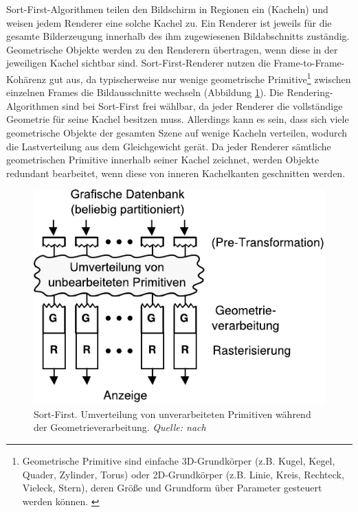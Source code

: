 Sort-First-Algorithmen teilen den Bildschirm in Regionen ein (Kacheln) und weisen jedem Renderer eine solche Kachel zu. Ein Renderer ist jeweils für die gesamte Bilderzeugung innerhalb des ihm zugewiesenen Bildabschnitts zuständig. Geometrische Objekte werden zu den Renderern übertragen, wenn diese in der jeweiligen Kachel sichtbar sind. Sort-First-Renderer nutzen die Frame-to-Frame-Kohärenz gut aus, da typischerweise nur wenige geometrische Primitive\footnote{Geometrische Primitive sind einfache 3D-Grundkörper (z.B. Kugel, Kegel, Quader, Zylinder, Torus) oder 2D-Grundkörper (z.B. Linie, Kreis, Rechteck, Vieleck, Stern), deren Größe und Grundform über Parameter gesteuert werden können. \cite{medieninfo}} zwischen einzelnen Frames die Bildausschnitte wechseln (Abbildung \ref{fig:relwork:sortfirst}). Die Rendering-Algorithmen sind bei Sort-First frei wählbar, da jeder Renderer die vollständige Geometrie für seine Kachel besitzen muss. Allerdings kann es sein, dass sich viele geometrische Objekte der gesamten Szene auf wenige Kacheln verteilen, wodurch die Lastverteilung aus dem Gleichgewicht gerät. Da jeder Renderer sämtliche geometrischen Primitive innerhalb seiner Kachel zeichnet, werden Objekte redundant bearbeitet, wenn diese von inneren Kachelkanten geschnitten werden.
\begin{figure}
 \centering
  \includegraphics[scale=0.8]{images/sort-first.pdf}
  \caption{Sort-First. Umverteilung von unverarbeiteten Primitiven während der Geometrieverarbeitung. \textit{Quelle: nach \cite{molnar}}}
 \label{fig:relwork:sortfirst}
\end{figure}

